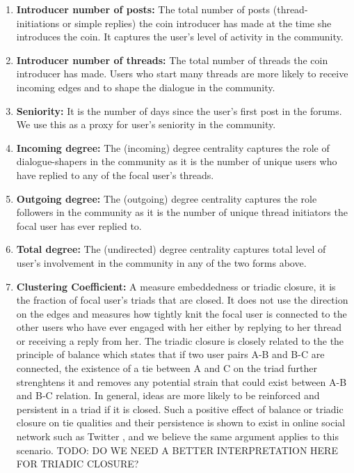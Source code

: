 \begin{enumerate}[topsep=0pt,itemsep=-0.5ex,partopsep=1ex,parsep=1ex]
  \item \textbf{Introducer number of posts:} The total number of posts (thread-initiations or simple replies) the coin introducer has made at the time she introduces the coin. It captures the user's level of activity in the community.
  \item \textbf{Introducer number of threads:} The total number of threads the coin introducer has made. Users who start many threads are more likely to receive incoming edges and to shape the dialogue in the community.
  \item \textbf{Seniority:} It is the number of days since the user's first post in the forums. We use this as a proxy for user's seniority in the community.
  \item \textbf{Incoming degree:} The (incoming) degree centrality captures the role of dialogue-shapers in the community as it is the number of unique users who have replied to any of the focal user's threads.
  \item \textbf{Outgoing degree:} The (outgoing) degree centrality captures the role followers in the community as it is the number of unique thread initiators the focal user has ever replied to.
  \item \textbf{Total degree:} The (undirected) degree centrality captures total level of user's involvement in the community in any of the two forms above.
  \item \textbf{Clustering Coefficient:} A measure embeddedness or triadic closure, it is the fraction of focal user's triads that are closed. It does not use the direction on the edges and measures how tightly knit the focal user is connected to the other users who have ever engaged with her either by replying to her thread or receiving a reply from her. The triadic closure is closely related to the the principle of balance which states that if two user pairs A-B and B-C are connected, the existence of a tie between A and C on the triad further strenghtens it and removes any potential strain that could exist between A-B and B-C relation. In general, ideas are more likely to be reinforced and persistent in a triad if it is closed. Such a positive effect of balance or triadic closure on tie qualities and their persistence is shown to exist in online social network such as Twitter \cite{KleinbergBalance}, and we believe the same argument applies to this scenario.
  TODO: DO WE NEED A BETTER INTERPRETATION HERE FOR TRIADIC CLOSURE?

\end{enumerate}
